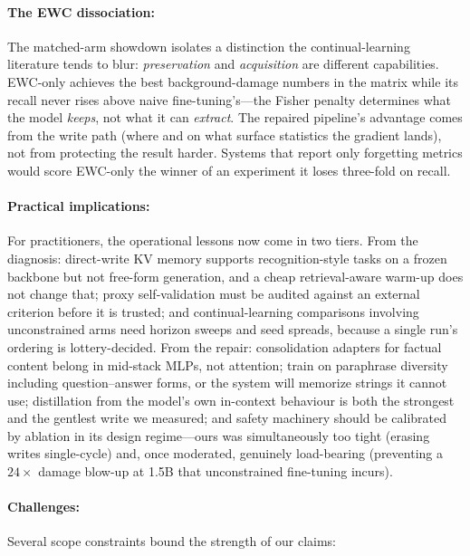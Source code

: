 \paragraph{The EWC dissociation:}
The matched-arm showdown isolates a distinction the continual-learning literature tends to blur: \emph{preservation} and \emph{acquisition} are different capabilities. EWC-only achieves the best background-damage numbers in the matrix while its recall never rises above naive fine-tuning's---the Fisher penalty determines what the model \emph{keeps}, not what it can \emph{extract}. The repaired pipeline's advantage comes from the write path (where and on what surface statistics the gradient lands), not from protecting the result harder. Systems that report only forgetting metrics would score EWC-only the winner of an experiment it loses three-fold on recall.

\paragraph{Practical implications:}
For practitioners, the operational lessons now come in two tiers. From the diagnosis: direct-write KV memory supports recognition-style tasks on a frozen backbone but not free-form generation, and a cheap retrieval-aware warm-up does not change that; proxy self-validation must be audited against an external criterion before it is trusted; and continual-learning comparisons involving unconstrained arms need horizon sweeps and seed spreads, because a single run's ordering is lottery-decided. From the repair: consolidation adapters for factual content belong in mid-stack MLPs, not attention; train on paraphrase diversity including question--answer forms, or the system will memorize strings it cannot use; distillation from the model's own in-context behaviour is both the strongest and the gentlest write we measured; and safety machinery should be calibrated by ablation in its design regime---ours was simultaneously too tight (erasing writes single-cycle) and, once moderated, genuinely load-bearing (preventing a $24\times$ damage blow-up at 1.5B that unconstrained fine-tuning incurs).

\paragraph{Challenges:}
Several scope constraints bound the strength of our claims:

